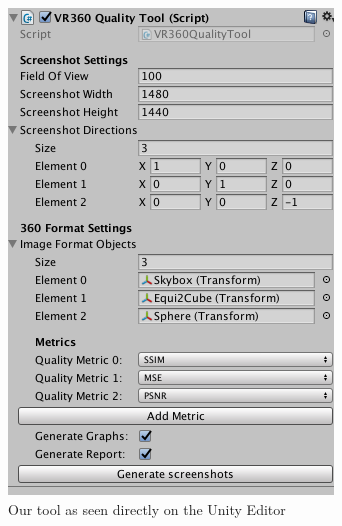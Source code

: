 \documentclass[12pt]{article}
\begin{document}
\begin{figure}[H]
    \centering
    \begin{minipage}[b]{0.4\textwidth}
        \includegraphics[width=\textwidth]{images/tool.png}
        \caption{Our tool as seen directly on the Unity Editor}
        \label{fig:tool}
    \end{minipage}
    \hfill
    \begin{minipage}[b]{0.4\textwidth}

\end{minipage}
\end{figure}
\end{document}
